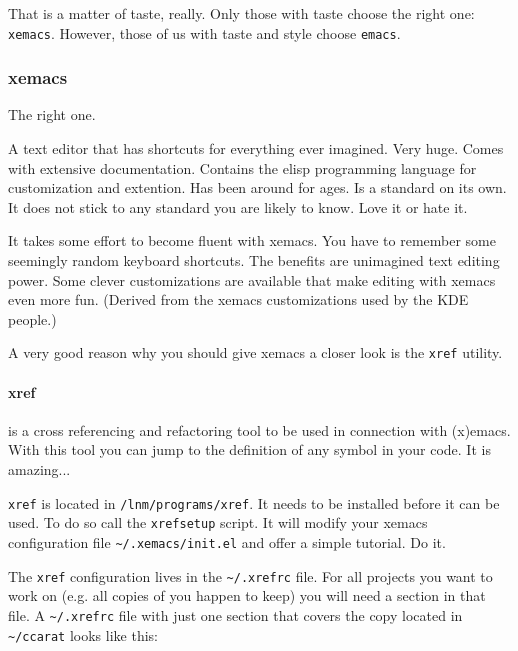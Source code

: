 That is a matter of taste, really. Only those with taste choose the
right one: \texttt{xemacs}. However, those of us with taste and style
choose \texttt{emacs}.


\subsubsection{xemacs}

The right one.

A text editor that has shortcuts for everything ever imagined. Very
huge. Comes with extensive documentation. Contains the elisp programming
language for customization and extention. Has been around for ages.
Is a standard on its own. It does not stick to any standard you are
likely to know. Love it or hate it.

It takes some effort to become fluent with xemacs. You have to remember
some seemingly random keyboard shortcuts. The benefits are unimagined
text editing power. Some clever customizations are available that
make editing with xemacs even more fun. (Derived from the xemacs customizations
used by the KDE people.)

A very good reason why you should give xemacs a closer look is the
\texttt{xref} utility.


\paragraph{xref}

is a cross referencing and refactoring tool to be used in connection
with (x)emacs. With this tool you can jump to the definition of any
symbol in your code. It is amazing...

\texttt{xref} is located in \texttt{/lnm/programs/xref}. It needs
to be installed before it can be used. To do so call the \texttt{xrefsetup}
script. It will modify your xemacs configuration file \texttt{\textasciitilde{}/.xemacs/init.el}
and offer a simple tutorial. Do it.

The \texttt{xref} configuration lives in the \texttt{\textasciitilde{}/.xrefrc}
file. For all projects you want to work on (e.g. all copies of \ccarat{}
you happen to keep) you will need a section in that file. A \texttt{\textasciitilde{}/.xrefrc}
file with just one section that covers the \ccarat{} copy located
in \texttt{\textasciitilde{}/ccarat} looks like this:

